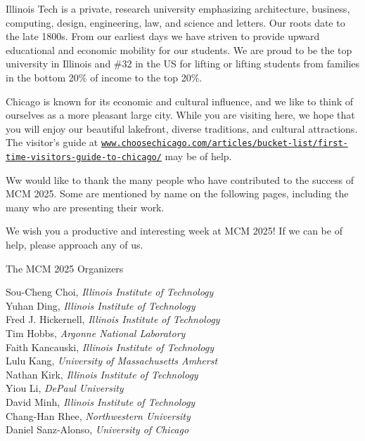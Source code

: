 Illinois Tech is a private, research university emphasizing architecture, business, computing, design, engineering, law, and science and letters.  Our roots date to the late 1800s.  From our earliest days we have striven to provide upward educational and economic mobility for our students.  We are proud to be the top university in Illinois and \#32 in the US for lifting or lifting students from families in the bottom 20\% of income to the top 20\%.

Chicago is known for its economic and cultural influence, and we like to think of ourselves as a more pleasant large city.  
While you are visiting here, we hope that you will enjoy our beautiful lakefront, diverse traditions, and cultural attractions. The visitor's guide at \href{https://www.choosechicago.com/articles/bucket-list/first-time-visitors-guide-to-chicago/}{\nolinkurl{www.choosechicago.com/articles/bucket-list/first-time-visitors-guide-to-chicago/}} may be of help.

Ww would like to thank the many people who have contributed to the success of MCM 2025.  Some are mentioned by name on the following pages, including the many who are presenting their work.

We wish you a productive and interesting week at MCM 2025! If we can be of help, please approach any of us.


\vspace{4ex}

The MCM 2025 Organizers 

\vspace{1ex}

Sou-Cheng Choi, \emph{Illinois Institute of Technology} \\
Yuhan Ding, \emph{Illinois Institute of Technology} \\
Fred J. Hickernell, \emph{Illinois Institute of Technology} \\
Tim Hobbs, \emph{Argonne National Laboratory} \\
Faith Kancauski, \emph{Illinois Institute of Technology} \\
Lulu Kang, \emph{University of Massachusetts Amherst} \\
Nathan Kirk, \emph{Illinois Institute of Technology} \\
Yiou Li, \emph{DePaul University} \\
David Minh, \emph{Illinois Institute of Technology} \\
Chang-Han Rhee, \emph{Northwestern University} \\
Daniel Sanz-Alonso, \emph{University of Chicago}


